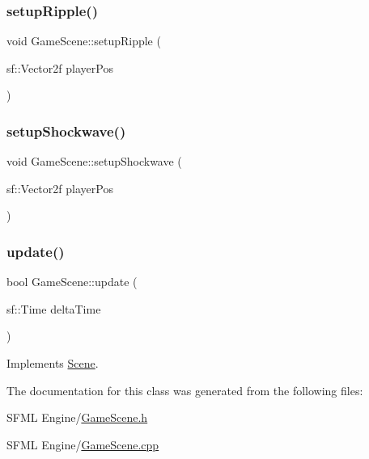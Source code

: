 \subsubsection{\texorpdfstring{setup\+Ripple()}{setupRipple()}}
{\footnotesize\ttfamily void Game\+Scene\+::setup\+Ripple (\begin{DoxyParamCaption}\item[{sf\+::\+Vector2f}]{player\+Pos }\end{DoxyParamCaption})}

\mbox{\label{class_game_scene_a67664e1bbce6bec9eda855a9b109d9ec}} 
\subsubsection{\texorpdfstring{setup\+Shockwave()}{setupShockwave()}}
{\footnotesize\ttfamily void Game\+Scene\+::setup\+Shockwave (\begin{DoxyParamCaption}\item[{sf\+::\+Vector2f}]{player\+Pos }\end{DoxyParamCaption})}

\mbox{\label{class_game_scene_ae54628d2f041bcad66242584b2db10d6}} 
\subsubsection{\texorpdfstring{update()}{update()}}
{\footnotesize\ttfamily bool Game\+Scene\+::update (\begin{DoxyParamCaption}\item[{sf\+::\+Time}]{delta\+Time }\end{DoxyParamCaption})\hspace{0.3cm}{\ttfamily [virtual]}}



Implements \hyperlink{class_scene_a72683c984a1da2ce4f757705e93730f2}{Scene}.



The documentation for this class was generated from the following files\+:\begin{DoxyCompactItemize}
\item 
S\+F\+M\+L Engine/\hyperlink{_game_scene_8h}{Game\+Scene.\+h}\item 
S\+F\+M\+L Engine/\hyperlink{_game_scene_8cpp}{Game\+Scene.\+cpp}\end{DoxyCompactItemize}
